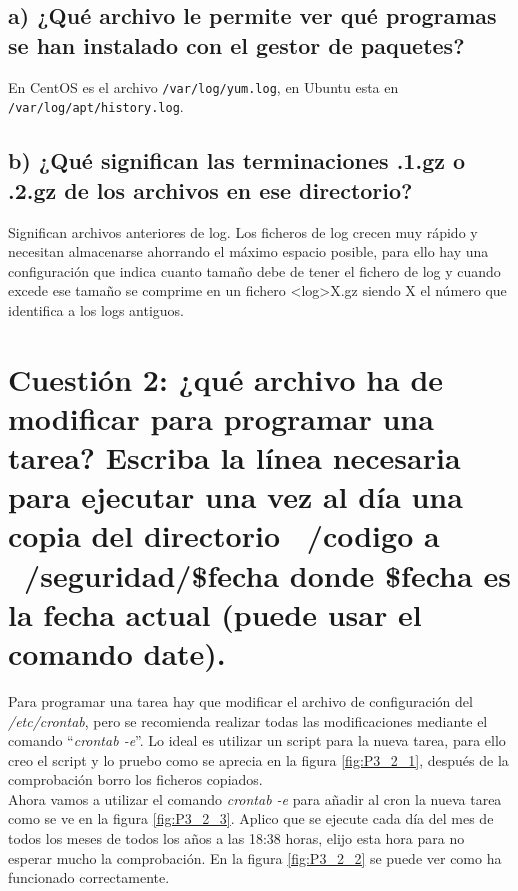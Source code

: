 \subsection{a) ¿Qué archivo le permite ver qué programas se han instalado con el gestor de paquetes?}
En CentOS es el archivo \texttt{/var/log/yum.log}, en Ubuntu esta en \texttt{/var/log/apt/history.log}.


\subsection{b) ¿Qué significan las terminaciones .1.gz o .2.gz de los archivos en ese directorio?}
Significan archivos anteriores de log. Los ficheros de log crecen muy rápido y necesitan almacenarse
ahorrando el máximo espacio posible, para ello hay una configuración que indica cuanto tamaño debe de
tener el fichero de log y cuando excede ese tamaño se comprime en un fichero <log>X.gz siendo X el número
que identifica a los logs antiguos.




\section{Cuestión 2: ¿qué archivo ha de modificar para programar una tarea? Escriba la línea necesaria para ejecutar una vez al día una copia del directorio ~/codigo a ~/seguridad/\$fecha donde \$fecha es la fecha actual (puede usar el comando date).}
Para programar una tarea hay que modificar el archivo de configuración del \textit{/etc/crontab},
pero se recomienda realizar todas las modificaciones mediante el comando ``\textit{crontab -e}''.
Lo ideal es utilizar un script para la nueva tarea, para ello creo el script y lo pruebo como
se aprecia en la figura \ref{fig:P3_2_1}, después de la comprobación borro los ficheros copiados. \\
Ahora vamos a utilizar el comando \textit{crontab -e} para añadir al cron la nueva tarea
como se ve en la figura \ref{fig:P3_2_3}. Aplico que se ejecute cada día del mes de todos los meses
de todos los años a las 18:38 horas, elijo esta hora para no esperar mucho la comprobación.
En la figura \ref{fig:P3_2_2} se puede ver como ha funcionado correctamente.

